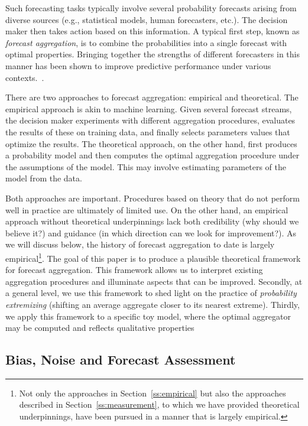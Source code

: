 \documentclass[11pt]{article}
\theoremstyle{definition}
\theoremstyle{definition}
\begin{document}
Such forecasting tasks typically involve several probability forecasts arising from diverse sources (e.g., statistical models, human forecasters, etc.). The decision maker then takes action based on this information. A typical first step, known as \textit{forecast aggregation}, is to combine the probabilities  into a single forecast with optimal properties. Bringing together the
strengths of different forecasters in this manner has been shown to improve predictive
performance under various contexts.~\citep{clemen1989combining, armstrong2001combining}.

There are two approaches to forecast aggregation: empirical
and theoretical.  The empirical approach is akin to machine
learning.  Given several forecast streams, the decision maker experiments
with different aggregation procedures, evaluates the results
of these on training data, and finally selects parameters values that optimize 
the results.  The theoretical approach, on the other hand, first produces a probability
model and then computes the optimal aggregation procedure under the 
assumptions of the model.  This may involve estimating parameters 
of the model from the data.  

Both approaches are important.  Procedures based on theory that
do not perform well in practice are ultimately of limited use.
On the other hand, an empirical approach without theoretical
underpinnings lack both credibility (why should we believe it?)
and guidance (in which direction can we look for improvement?).
As we will discuss below, the history of forecast aggregation
to date is largely empirical\footnote{Not only the approaches in
Section~\ref{ss:empirical} but also the approaches described in
Section~\ref{ss:measurement}, to which we have provided theoretical 
underpinnings, have been pursued in a manner that is largely empirical.}.  
The goal of this paper is to
produce a plausible theoretical framework for forecast aggregation.
This framework allows us to interpret existing aggregation 
procedures and illuminate aspects that can be improved.
Secondly, at a general level, we use this framework to shed light on 
the practice of {\em probability extremizing} (shifting an average aggregate closer to its nearest extreme). Thirdly, we apply
this framework to a specific toy model, where the optimal 
aggregator may be computed and reflects qualitative properties 

\subsection{Bias, Noise and Forecast Assessment}
\end{document}
